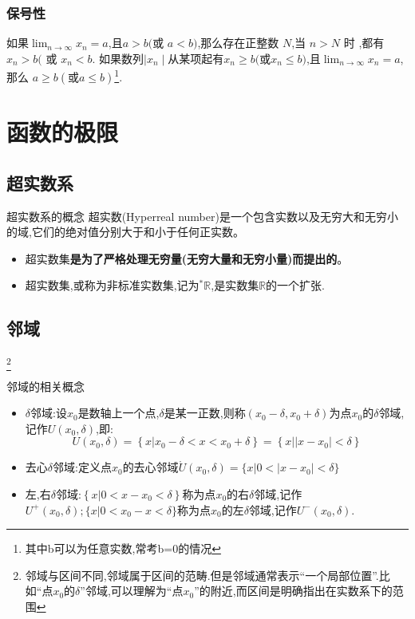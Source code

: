 \documentclass[10pt, a4paper, oneside, UTF8]{ctexbook}
\begin{document}
\begin{sloppypar}
    \subsubsection{保号性}
    \begin{defn}{}{}
        如果$\lim_{n\to\infty}x_n=a$,且$a{>}b( $或 $a{<}b)$,那么存在正整数 $N$,当 $n{>}N$ 时 ,都有$x_n{>}b($ 或 $x_n{<}b$.\newline
        如果数列$\mid x_n\mid$从某项起有$x_n\geqslant b($或$x_n\leqslant b)$,且$\lim_{n\to\infty}x_n=a $,那么 $a\geqslant b( 或 a\leqslant b)$\footnote{其中b可以为任意实数,常考b=0的情况}.
    \end{defn}
    \section{函数的极限}
    \subsection{超实数系}
    \begin{defn}{超实数系的概念}{}
        超实数(Hyperreal number)是一个包含实数以及无穷大和无穷小的域,它们的绝对值分别大于和小于任何正实数。
    \end{defn}
    \begin{criterion}{}{}
        \begin{itemize}
            \item 超实数集\textbf{是为了严格处理无穷量(无穷大量和无穷小量)而提出的}。
            \item 超实数集,或称为非标准实数集,记为$^{*}\mathbb{R}$,是实数集$\mathbb{R}$的一个扩张.
        \end{itemize}
    \end{criterion}
    \subsection{邻域}\footnote{邻域与区间不同,邻域属于区间的范畴.但是邻域通常表示“一个局部位置”.比如“点$x_0$的$\delta$”邻域,可以理解为“点$x_0$”的附近,而区间是明确指出在实数系下的范围}
    \begin{defn}{邻域的相关概念}{}
        \begin{itemize}
            \item $\delta$邻域:设$x_0$是数轴上一个点,$\delta$是某一正数,则称$(x_{0}-\delta,x_{0}+\delta)$为点$x_0$的$\delta$邻域,记作$U(x_{0},\delta)$,即:
                  $$
                      U(x_{0},\delta)=\left\{x|x_{0}-\delta<x<x_{0}+\delta\right\}=\left\{\left.x\right|\left|\left.x-x_{0}\right|<\delta\right\}\right.
                  $$
            \item 去心$\delta$邻域:定义点$x_0$的去心邻域$\mathring{U}(x_{0},\delta)=\bigl\{x|0<\bigl|x-x_{0}\bigr|<\delta\bigr\}$
            \item 左,右$\delta$邻域:$\left\{x|0<x-x_{0}<\delta\right\}$称为点$x_0$的右$\delta$邻域,记作$U^{+}(x_{0},\delta);\{x|0<x_{0}-x<\delta\}$称为点$x_0$的左$\delta$邻域,记作$U^{-}(x_{0},\delta).$
        \end{itemize}
    \end{defn}

\end{sloppypar}
\end{document}
